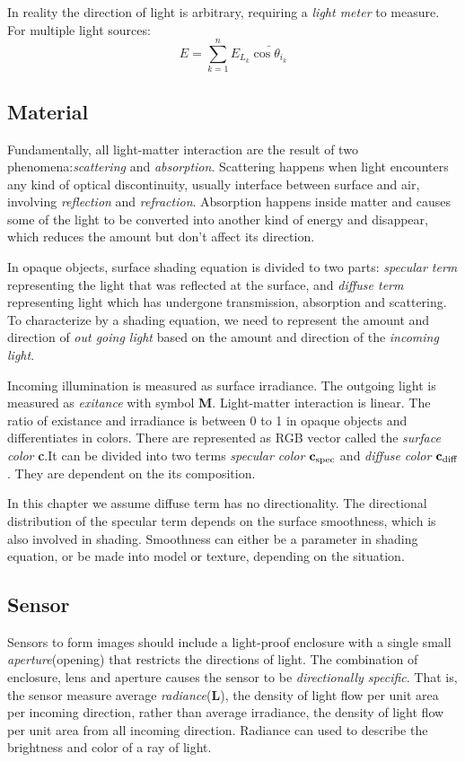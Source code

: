 \documentclass[10pt, a4paper]{article}
\begin{document}
        In reality the direction of light is arbitrary, requiring a \emph{light meter} to measure. For multiple light sources: 
        $$E = \sum_{k = 1}^{n}E_{L_k}\bar{\cos{\theta_{i_k}}}$$
    
    \subsection{Material}
        Fundamentally, all light-matter interaction are the result of two phenomena:\emph{scattering} and \emph{absorption}. Scattering happens when light encounters any kind of optical discontinuity, usually interface between surface and air, involving \emph{reflection} and \emph{refraction}. Absorption happens inside matter and causes some of the light to be converted into another kind of energy and disappear, which reduces the amount but don't affect its direction. 
        
        In opaque objects, surface shading equation is divided to two parts: \emph{specular term} representing the light that was reflected at the surface, and \emph{diffuse term} representing light which has undergone transmission, absorption and scattering. To characterize by a shading equation, we need to represent the amount and direction of \emph{out going light} based on the amount and direction of the \emph{incoming light}.

        Incoming illumination is measured as surface irradiance. The outgoing light is measured as \emph{exitance} with symbol \textbf{M}. Light-matter interaction is linear. The ratio of existance and irradiance is between 0 to 1 in opaque objects and differentiates in colors. There are represented as RGB vector called the \emph{surface color} \textbf{c}.It can be divided into two terms \emph{specular color} $\textbf{c}_{\rm{spec}}$ and \emph{diffuse color} $\textbf{c}_{\rm{diff}}$. They are dependent on the its composition.
        
        In this chapter we assume diffuse term has no directionality. The directional distribution of the specular term depends on the surface smoothness, which is also involved in shading. Smoothness can either be a parameter in shading equation, or be made into model or texture, depending on the situation. 

    \subsection{Sensor}
        Sensors to form images should include a light-proof enclosure with a single small \emph{aperture}(opening) that restricts the directions of light. The combination of enclosure, lens and aperture causes the sensor to be \emph{directionally specific}. That is, the sensor measure average \emph{radiance}($\textbf{L}$), the density of light flow per unit area per incoming direction, rather than average irradiance, the density of light flow per unit area from all incoming direction. Radiance can used to describe the brightness and color of a ray of light. 
\end{document}
